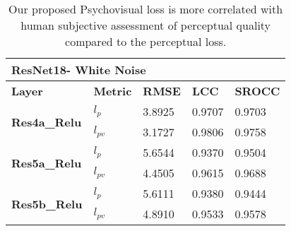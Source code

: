 \documentclass[10pt,twocolumn,letterpaper]{article}
\begin{document}
\begin{table}[]
\caption{Our proposed Psychovisual loss is more correlated with human subjective assessment of perceptual quality compared to the perceptual loss.}
\begin{tabular}{|l|l|l|l|l|}
\hline
\multicolumn{5}{|l|}{\textbf{ResNet18- White Noise}}                                                    \\ \hline
\textbf{Layer}                        & \textbf{Metric} & \textbf{RMSE} & \textbf{LCC} & \textbf{SROCC} \\ \hline
\multirow{2}{*}{\textbf{Res4a\_Relu}} & \textbf{$l_{p}$}              & 3.8925        & 0.9707       & 0.9703         \\ \cline{2-5} 
                                      & \textbf{$l_{pv}$}             & 3.1727        & 0.9806       & 0.9758         \\ \hline
\multirow{2}{*}{\textbf{Res5a\_Relu}} & \textbf{$l_{p}$}              & 5.6544        & 0.9370       & 0.9504         \\ \cline{2-5} 
                                      & \textbf{$l_{pv}$}             & 4.4505        & 0.9615       & 0.9688         \\ \hline
\multirow{2}{*}{\textbf{Res5b\_Relu}} & \textbf{$l_{p}$}              & 5.6111        & 0.9380       & 0.9444         \\ \cline{2-5} 
                                      & \textbf{$l_{pv}$}             & 4.8910        & 0.9533       & 0.9578         \\ \hline
\end{tabular}
\end{table}
\end{document}
